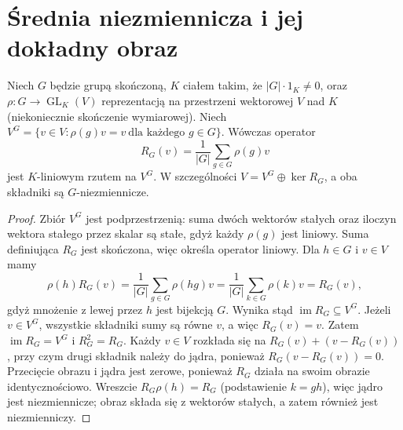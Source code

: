 \section{Średnia niezmiennicza i jej dokładny obraz}
\begin{stwierdzenie}\label{aa:prop:reynolds-vectors}
Niech $G$ będzie grupą skończoną, $K$ ciałem takim, że
$|G|\cdot1_K\ne0$, oraz $\rho:G\to\operatorname{GL}_K(V)$
reprezentacją na przestrzeni wektorowej $V$ nad $K$ (niekoniecznie
skończenie wymiarowej). Niech
$V^G=\{v\in V:\rho(g)v=v\ \text{dla każdego }g\in G\}$.
Wówczas operator
\[
R_G(v)=\frac1{|G|}\sum_{g\in G}\rho(g)v
\]
jest $K$-liniowym rzutem na $V^G$. W szczególności
$V=V^G\oplus\ker R_G$, a oba składniki są $G$-niezmiennicze.
\end{stwierdzenie}
\begin{proof}
Zbiór $V^G$ jest podprzestrzenią: suma dwóch wektorów
stałych oraz iloczyn wektora stałego przez skalar są stałe,
gdyż każdy $\rho(g)$ jest liniowy. Suma definiująca $R_G$
jest skończona, więc określa operator liniowy. Dla $h\in G$
i $v\in V$ mamy
\[
\rho(h)R_G(v)=\frac1{|G|}\sum_{g\in G}\rho(hg)v
=\frac1{|G|}\sum_{k\in G}\rho(k)v=R_G(v),
\]
gdyż mnożenie z lewej przez $h$ jest bijekcją $G$.
Wynika stąd $\operatorname{im}R_G\subseteq V^G$.
Jeżeli $v\in V^G$, wszystkie składniki sumy są równe $v$,
a więc $R_G(v)=v$. Zatem $\operatorname{im}R_G=V^G$
i $R_G^2=R_G$. Każdy $v\in V$ rozkłada się na
$R_G(v)+(v-R_G(v))$, przy czym drugi składnik należy
do jądra, ponieważ $R_G(v-R_G(v))=0$.
Przecięcie obrazu i jądra jest zerowe, ponieważ $R_G$
działa na swoim obrazie identycznościowo.
Wreszcie $R_G\rho(h)=R_G$ (podstawienie $k=gh$),
więc jądro jest niezmiennicze; obraz składa się z wektorów
stałych, a zatem również jest niezmienniczy.
\end{proof}

